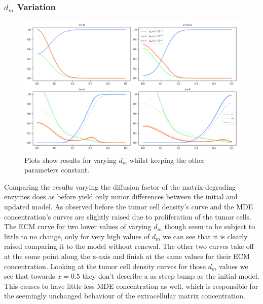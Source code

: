 \subsubsection*{$d_m$ Variation}
\begin{figure}[h]
    \centering
    \includegraphics[width=\textwidth]{resources/images/prolif_dm_variation.png}
    \caption{Plots show results for varying $d_m$ whilst keeping the other parameters constant.}
    \label{fig:prolif_dm_variation}
\end{figure}

Comparing the results varying the diffusion factor of the matrix-degrading enzymes does as before yield only minor differences between the initial and updated model. As observed before the tumor cell density's curve and the MDE concentration's curves are slightly raised due to proliferation of the tumor cells. The ECM curve for two lower values of varying $d_m$ though seem to be subject to little to no change, only for very high values of $d_m$ we can see that it is clearly raised comparing it to the model without renewal. The other two curves take off at the some point along the x-axis and finish at the same values for their ECM concentration. Looking at the tumor cell density curves for those $d_m$ values we see that towards $x=0.5$ they don't describe a as steep bump as the initial model. This causes to have little less MDE concentration as well, which is responsible for the seemingly unchanged behaviour of the extracellular matrix concentration.

